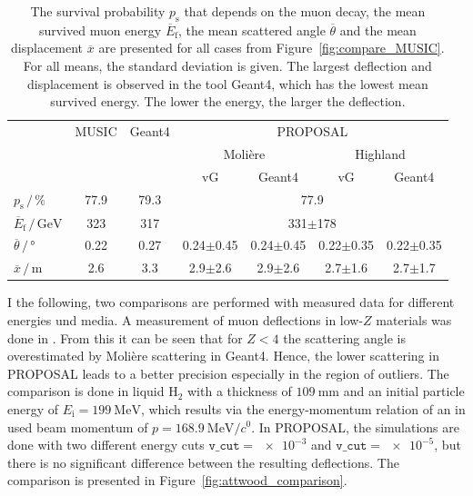 \documentclass[pdflatex, sn-mathphys]{sn-jnl}%
\theoremstyle{thmstyleone}%
\theoremstyle{thmstyletwo}%
\theoremstyle{thmstylethree}%
\begin{document}
\begin{table}
    \small
    \centering
    \caption{The survival probability $p_{\text{s}}$ that depends on the muon decay, the mean survived muon 
    energy $\overline{E}_{\text{f}}$, the mean scattered angle $\overline{\theta}$ 
    and the mean displacement $\overline{x}$ are presented for all cases from 
    Figure~\ref{fig:compare_MUSIC}. For all means, the standard deviation is given.
    The largest deflection and displacement is observed in the tool Geant4, which has the lowest mean survived energy. The lower the energy, the larger the deflection.}
    \begin{tabular}{l|cc|cccc}
        \toprule
        & MUSIC & Geant4 & \multicolumn{4}{c}{PROPOSAL} \\
        &  & & \multicolumn{2}{c}{Molière} & \multicolumn{2}{c}{Highland} \\
        &  &  & vG & Geant4 & vG & Geant4 \\
        \midrule
        $p_{\text{s}}\,/\,\si{\percent}$ & 77.9 & 79.3 &  \multicolumn{4}{c}{77.9}\\
        $\overline{E}_{\text{f}}\,/\,\si{\giga\electronvolt}$ & 323 & 317 & \multicolumn{4}{c}{331$\pm$178} \\
        $\overline{\theta}\,/\,\si{\degree}$ & 0.22 & 0.27 & 0.24$\pm$0.45 & 0.24$\pm$0.45 & 0.22$\pm$0.35 & 0.22$\pm$0.35   \\
        $\overline{x}\,/\,\si{\meter}$ & 2.6 & 3.3 & 2.9$\pm$2.6 & 2.9$\pm$2.6 & 2.7$\pm$1.6 & 2.7$\pm$1.7  \\
     \bottomrule
    \end{tabular}
    \label{tab:compare_MUSIC}
\end{table}

I the following, two comparisons are performed with measured data for 
different energies und media.
A measurement of muon deflections in low-$Z$ materials was done in \cite{attwood_2006}. 
From this it can be seen that for $Z < 4$ the scattering angle is overestimated 
by Molière scattering in Geant4. Hence, the lower scattering in PROPOSAL leads 
to a better precision especially in the region of outliers. The comparison is 
done in liquid $\text{H}_2$ with a thickness of $\SI{109}{\milli\meter}$ and an 
initial particle energy of $E_{\mathrm{i}} = \SI{199}{\mega\electronvolt}$, which 
results via the energy-momentum relation of an in \cite{attwood_2006} used beam momentum 
of $p = \SI[per-mode=symbol]{168.9}{\mega\electronvolt\per\clight}$. 
In PROPOSAL, the simulations are done with two different energy cuts $\texttt{v\_cut} = \num{e-3}$ and $\texttt{v\_cut} = \num{e-5}$, 
but there is no significant difference between the resulting deflections.
The comparison is presented in Figure~\ref{fig:attwood_comparison}.
\end{document}
